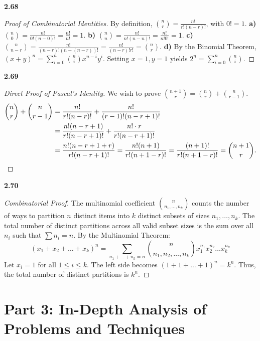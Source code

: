 \documentclass[11pt]{article}
\theoremstyle{definition}
\begin{document}
\textbf{2.68} 
\begin{proof}[Proof of Combinatorial Identities]
By definition, $\binom{n}{r} = \frac{n!}{r!(n-r)!}$, with $0! = 1$.
\textbf{a)} $\binom{n}{0} = \frac{n!}{0!(n-0)!} = \frac{n!}{n!} = 1$.
\textbf{b)} $\binom{n}{n} = \frac{n!}{n!(n-n)!} = \frac{n!}{n!0!} = 1$.
\textbf{c)} $\binom{n}{n-r} = \frac{n!}{(n-r)!(n-(n-r))!} = \frac{n!}{(n-r)!r!} = \binom{n}{r}$.
\textbf{d)} By the Binomial Theorem, $(x+y)^n = \sum_{i=0}^n \binom{n}{i} x^{n-i} y^i$. Setting $x=1, y=1$ yields $2^n = \sum_{i=0}^n \binom{n}{i}$.
\end{proof}

\textbf{2.69} 
\begin{proof}[Direct Proof of Pascal's Identity]
We wish to prove $\binom{n+1}{r} = \binom{n}{r} + \binom{n}{r-1}$.
\begin{align*}
\binom{n}{r} + \binom{n}{r-1} &= \frac{n!}{r!(n-r)!} + \frac{n!}{(r-1)!(n-r+1)!} \\
&= \frac{n!(n-r+1)}{r!(n-r+1)!} + \frac{n! \cdot r}{r!(n-r+1)!} \\
&= \frac{n!(n-r+1 + r)}{r!(n-r+1)!} = \frac{n!(n+1)}{r!(n+1-r)!} = \frac{(n+1)!}{r!(n+1-r)!} = \binom{n+1}{r}. \qedhere
\end{align*}
\end{proof}

\textbf{2.70} 
\begin{proof}[Combinatorial Proof]
The multinomial coefficient $\binom{n}{n_1, \dots, n_k}$ counts the number of ways to partition $n$ distinct items into $k$ distinct subsets of sizes $n_1, \dots, n_k$. The total number of distinct partitions across all valid subset sizes is the sum over all $n_i$ such that $\sum n_i = n$. By the Multinomial Theorem:
\[ (x_1 + x_2 + \dots + x_k)^n = \sum_{n_1+\dots+n_k=n} \binom{n}{n_1, n_2, \dots, n_k} x_1^{n_1} x_2^{n_2} \dots x_k^{n_k} \]
Let $x_i = 1$ for all $1 \leq i \leq k$. The left side becomes $(1 + 1 + \dots + 1)^n = k^n$. Thus, the total number of distinct partitions is $k^n$.
\end{proof}


\section{Part 3: In-Depth Analysis of Problems and Techniques}
\end{document}
